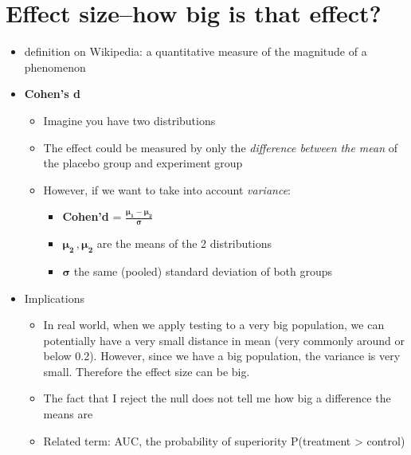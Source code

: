\section{Effect size--how big is that effect?}
\begin{itemize}
    \item definition on Wikipedia: a quantitative measure of the magnitude of a phenomenon
    \item \textbf{Cohen's d}
    \begin{itemize}
        \item Imagine you have two distributions
        \item The effect could be measured by only the \textit{difference between the mean} of the placebo group and experiment group
        \item However, if we want to take into account \textit{variance}:
        \begin{itemize}
            \item \textbf{Cohen'd} = {\huge $\pmb{\frac{\mu_1 - \mu_2}{\sigma}}$}
            \item $\pmb{\mu_2\, , \mu_2}$ are the means of the 2 distributions
            \item $\pmb{\sigma}$ the same (pooled) standard deviation of both groups
        \end{itemize}
    \end{itemize}
    \item Implications
    \begin{itemize}
        \item In real world, when we apply testing to a very big population, we can potentially have a very small distance in mean (very commonly around or below 0.2). However, since we have a big population, the variance is very small. Therefore the effect size can be big. 
        \item The fact that I reject the null does not tell me how big a difference the means are
        \item Related term: AUC, the probability of superiority P(treatment > control)
    \end{itemize}
\end{itemize}

